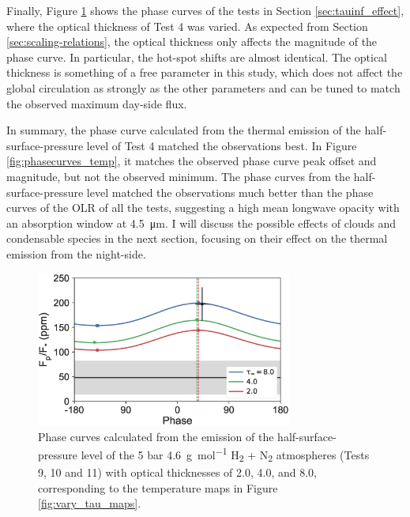 Finally, Figure \ref{fig:phasecurves_tauinf} shows the phase curves of the tests in Section \ref{sec:tauinf_effect}, where the optical thickness of Test 4 was varied. As expected from Section \ref{sec:scaling-relations}, the optical thickness only affects the magnitude of the phase curve. In particular, the hot-spot shifts are almost identical. The optical thickness is something of a free parameter in this study, which does not affect the global circulation as strongly as the other parameters and can be tuned to match the observed maximum day-side flux.

In summary, the phase curve calculated from the thermal emission of the half-surface-pressure level of Test 4 matched the observations best. In Figure \ref{fig:phasecurves_temp}, it matches the observed phase curve peak offset and magnitude, but not the observed minimum. The phase curves from the half-surface-pressure level matched the observations much better than the phase curves of the OLR of all the tests, suggesting a high mean longwave opacity with an absorption window at \SI{4.5}{\micro\metre}. I will discuss the possible effects of clouds and condensable species in the next section, focusing on their effect on the thermal emission from the night-side.


\begin{figure}
  \centering
  \includegraphics[width=0.75\textwidth]{figures/linking-climate-55cnce/phasecurves_vs_tau.eps}
\caption{Phase curves calculated from the emission of the half-surface-pressure level of the 5 bar \SI{4.6}{\gram\per\mole} H\textsubscript{2} + N\textsubscript{2} atmospheres (Tests 9, 10 and 11) with optical thicknesses of 2.0, 4.0, and 8.0, corresponding to the temperature maps in Figure \ref{fig:vary_tau_maps}.\label{fig:phasecurves_tauinf}}
\end{figure}





